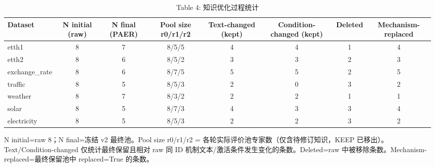 \begin{table}[htbp]
  \centering
  \caption{Table 4: 知识优化过程统计}
  \label{tab:opt}
  \begin{tabular}{lccccccc}
    \toprule
    Dataset & N initial (raw) & N final (PAER) & Pool size r0/r1/r2 & Text-changed (kept) & Condition-changed (kept) & Deleted & Mechanism-replaced \\
    \midrule
    etth1 & 8 & 7 & 8/5/5 & 4 & 4 & 1 & 4 \\
    etth2 & 8 & 6 & 8/5/2 & 3 & 3 & 2 & 3 \\
    exchange\_rate & 8 & 6 & 8/7/5 & 5 & 5 & 2 & 5 \\
    traffic & 8 & 5 & 8/5/3 & 2 & 0 & 3 & 2 \\
    weather & 8 & 7 & 8/3/2 & 2 & 2 & 1 & 1 \\
    solar & 8 & 5 & 8/7/3 & 4 & 3 & 3 & 4 \\
    electricity & 8 & 5 & 8/5/3 & 2 & 2 & 3 & 2 \\
    \bottomrule
  \end{tabular}
  {\footnotesize N initial=raw 8；N final=冻结 v2 最终池。Pool size r0/r1/r2 = 各轮实际评价池专家数（仅含待修订知识，KEEP 已移出）。Text/Condition-changed 仅统计最终保留且相对 raw 同 ID 机制文本/激活条件发生变化的条数。Deleted=raw 中被移除条数。Mechanism-replaced=最终保留池中 replaced=True 的条数。}
\end{table}
